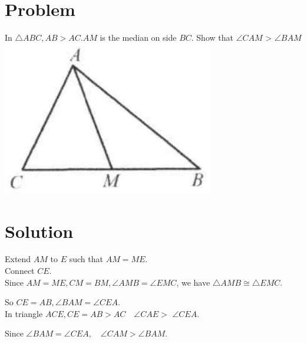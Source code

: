 \documentclass{article}
\begin{document}
\section*{Problem}
In \(\triangle A B C, A B>A C . A M\) is the median on side \(B C\). Show that \(\angle C A M\) > \(\angle B A M\)\\
\centering
\includegraphics[width=\textwidth]{images/027.jpg}

\section*{Solution}
Extend \(A M\) to \(E\) such that \(A M=M E\).\\
Connect \(C E\).\\
Since \(A M=M E, C M=B M, \angle A M B=\angle E M C\), we have \(\triangle A M B \cong \triangle E M C\).

So \(C E=A B, \angle B A M=\angle C E A\).\\
In triangle \(A C E, C E=A B>A C \quad \angle C A E>\) \(\angle C E A\).

Since \(\angle B A M=\angle C E A, \quad \angle C A M>\angle B A M\).
\end{document}
